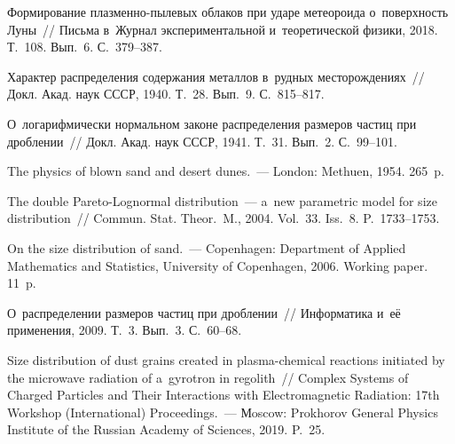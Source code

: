 \begin{multicols}{2}
\vspace*{-6pt}

{\small\frenchspacing
 {%
 \begin{thebibliography}{99}


\vspace*{-2pt}

Формирование плазменно-пылевых облаков при ударе метеороида о~поверхность 
Луны~// Письма в~Журнал экспериментальной и~теоретической физики, 2018. 
Т.~108. Вып.~6. С.~379--387.

 Характер распределения содержания металлов 
в~рудных месторождениях~// Докл. Акад. наук СССР, 1940. Т.~28. Вып.~9. 
С.~815--817.

 О~логарифмически нормальном законе распределения 
размеров частиц при дроблении~// Докл. Акад. наук СССР, 1941. Т.~31. 
Вып.~2. С.~99--101.


 The physics of blown sand and desert dunes.~--- 
London: Methuen, 1954. 265~p.

 The double Pareto-Lognormal distribution~--- 
a~new parametric model for size distribution~//
Commun. Stat. Theor.~M., 2004. Vol.~33. 
Iss.~8. P.~1733--1753.

 On the size distribution of sand.~--- 
Copenhagen: Department of Applied Mathematics and Statistics, 
University of Copenhagen, 2006.  Working 
paper. 11~p.

 О~распределении размеров частиц при дроблении~// 
Информатика и~её применения, 2009. Т.~3. Вып.~3. С.~60--68.

 Size distribution of dust grains 
created in plasma-chemical reactions initiated by the microwave radiation 
of a~gyrotron in regolith~// Complex Systems of Charged Particles and 
Their Interactions with Electromagnetic Radiation: 17th Workshop 
(International) Proceedings.~--- Мoscow: Prokhorov General Physics Institute 
of the Russian Academy of Sciences, 2019. P.~25.


\end{thebibliography}}}
\end{multicols}
